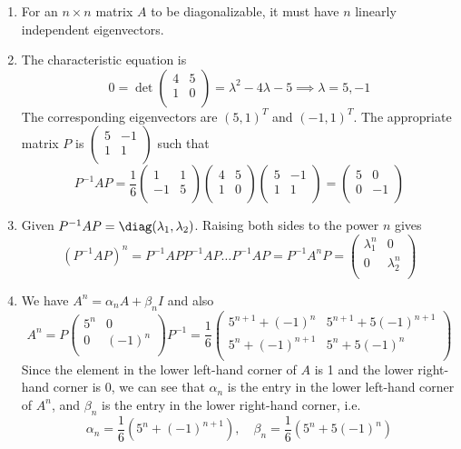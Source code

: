 \documentclass[a4paper]{article}
\begin{document}
\begin{ans}\leavevmode
\begin{enumerate}[label=(\alph*)]
\item For an $n\times n$ matrix $A$ to be diagonalizable, it must have $n$ linearly independent eigenvectors.
\item The characteristic equation is 
$$0=\det\begin{pmatrix}4&5\\1&0\\\end{pmatrix}=\lambda^2-4\lambda-5\implies\lambda=5,-1$$
The corresponding eigenvectors are $(5,1)^T$ and $(-1,1)^T$. The appropriate matrix $P$ is $\begin{pmatrix}5&-1\\1&1\\\end{pmatrix}$ such that
$$P^{-1}AP=\frac{1}{6}\begin{pmatrix}1&1\\-1&5\\\end{pmatrix}\begin{pmatrix}4&5\\1&0\\\end{pmatrix}\begin{pmatrix}5&-1\\1&1\\\end{pmatrix}=\begin{pmatrix}5&0\\0&-1\\\end{pmatrix}$$
\item Given $P^{-1}AP=\diag(\lambda_1,\lambda_2)$. Raising both sides to the power $n$ gives
$$(P^{-1}AP)^n=P^{-1}APP^{-1}AP\dots P^{-1}AP=P^{-1}A^nP=\begin{pmatrix}\lambda_1^n&0\\0&\lambda_2^n\\\end{pmatrix}$$
\item We have $A^n=\alpha_nA+\beta_nI$ and also
$$A^n=P\begin{pmatrix}5^n&0\\0&(-1)^n\\\end{pmatrix}P^{-1}=\frac{1}{6}\begin{pmatrix}5^{n+1}+(-1)^n&5^{n+1}+5(-1)^{n+1}\\5^n+(-1)^{n+1}&5^n+5(-1)^n\\\end{pmatrix}$$
Since the element in the lower left-hand corner of $A$ is 1 and the lower right-hand corner is 0, we can see that $\alpha_n$ is the entry in the lower left-hand corner of $A^n$, and $\beta_n$ is the entry in the lower right-hand corner, i.e.
$$\alpha_n=\frac{1}{6}(5^n+(-1)^{n+1}),\quad \beta_n=\frac{1}{6}(5^n+5(-1)^n)$$
\end{enumerate}
\end{ans}
\end{document}
